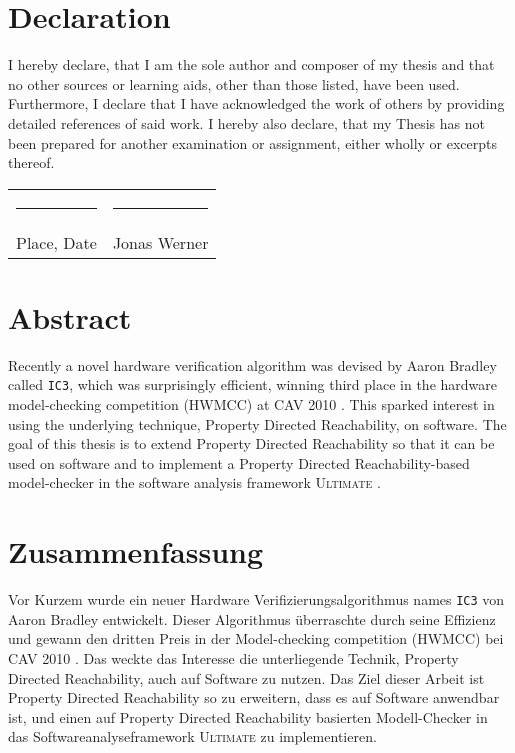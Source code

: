 \documentclass[11pt, a4paper, BCOR=10mm, ngerman]{scrbook}
\begin{document}
\pagebreak

\chapter*{Declaration}

I hereby declare, that I am the sole author and composer of my thesis and that no other sources or learning aids, other than those listed, have been used. Furthermore, I declare that I have acknowledged the work of others by providing detailed references of said work.  \newline
I hereby also declare, that my Thesis has not been prepared for another examination
or assignment, either wholly or excerpts thereof.
\\[3\normalbaselineskip]
\begin{tabular}{p{} l}
  \rule{0.33\textwidth}{0.4pt}   &   \rule{0.33\textwidth}{0.4pt} \\
  Place, Date                  &   Jonas Werner
\end{tabular}

\chapter*{Abstract}
Recently a novel hardware verification algorithm was devised by Aaron Bradley \cite{DBLP:conf/vmcai/Bradley11} called \texttt{IC3}, which was surprisingly efficient, winning third place in the hardware
model-checking competition (HWMCC) at CAV 2010 \cite{cav}. This sparked interest in using the underlying technique, Property Directed Reachability, on software.
The goal of this thesis is to extend Property Directed Reachability so that it can be used on software and to implement a Property Directed Reachability-based model-checker in the software analysis framework \textsc{Ultimate} \cite{Zitat02}.


\chapter*{Zusammenfassung}
Vor Kurzem wurde ein neuer Hardware Verifizierungsalgorithmus names \texttt{IC3} von Aaron Bradley \cite{DBLP:conf/vmcai/Bradley11} entwickelt. Dieser Algorithmus überraschte durch seine Effizienz und gewann den dritten Preis in der Model-checking competition (HWMCC) bei CAV 2010 \cite{cav}. Das weckte das Interesse die unterliegende Technik, Property Directed Reachability, auch auf Software zu nutzen. Das Ziel dieser Arbeit ist Property Directed Reachability so zu erweitern, dass es auf Software anwendbar ist, und einen auf Property Directed Reachability basierten  Modell-Checker in das Softwareanalyseframework \textsc{Ultimate} zu implementieren.
\end{document}

